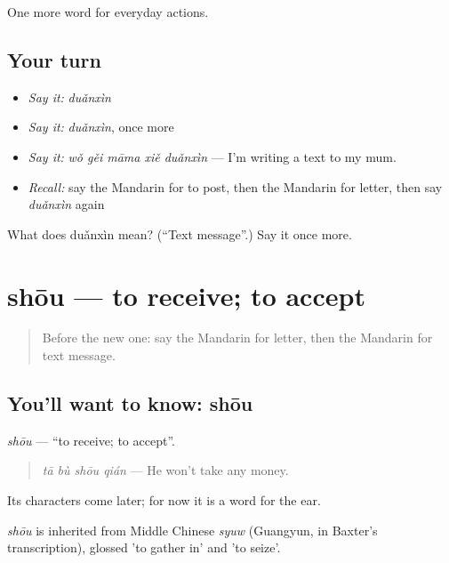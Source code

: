 \begin{grammarlens}[title={What you've built}]
One more word for everyday actions.
\end{grammarlens}

\subsection*{Your turn}
\begin{itemize}
\raggedright
  \item \emph{Say it:} \emph{duǎnxìn}
  \item \emph{Say it:} \emph{duǎnxìn}, once more
  \item \emph{Say it:} \emph{wǒ gěi māma xiě duǎnxìn} — I'm writing a text to my mum.
  \item \emph{Recall:} say the Mandarin for to post, then the Mandarin for letter, then say \emph{duǎnxìn} again
\end{itemize}

\begin{tcolorbox}[breakable,colback=teal!4,colframe=teal!35!black,title={Before you move on}]
What does duǎnxìn mean? (\textquotedblleft{}Text message\textquotedblright{}.) Say it once more.
\end{tcolorbox}
\section[shōu]{shōu — to receive; to accept}

\label{lesson:ZH-C118-shou}



\begin{quote}
Before the new one: say the Mandarin for letter, then the Mandarin for text message.
\end{quote}

\subsection*{You'll want to know: shōu}
\emph{shōu} — \textquotedblleft{}to receive; to accept\textquotedblright{}.

\begin{quote}
\emph{tā bù shōu qián} — He won't take any money.
\end{quote}

Its characters come later; for now it is a word for the ear.

\begin{cousinweb}
\emph{shōu} is inherited from Middle Chinese \emph{syuw} (Guangyun, in Baxter's transcription), glossed 'to gather in' and 'to seize'.
\end{cousinweb}

